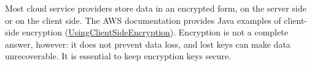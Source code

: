 \medskip

Most cloud service providers store data in an encrypted form, on the server side or on the client side. The AWS documentation provides Java examples of client-side encryption (\href{https://docs.aws.amazon.com/AmazonS3/latest/dev/UsingClientSideEncryption.html}{UsingClientSideEncryption}). Encryption is not a complete answer, however: it does not prevent data loss, and lost keys can make data unrecoverable. It is essential to keep encryption keys secure.